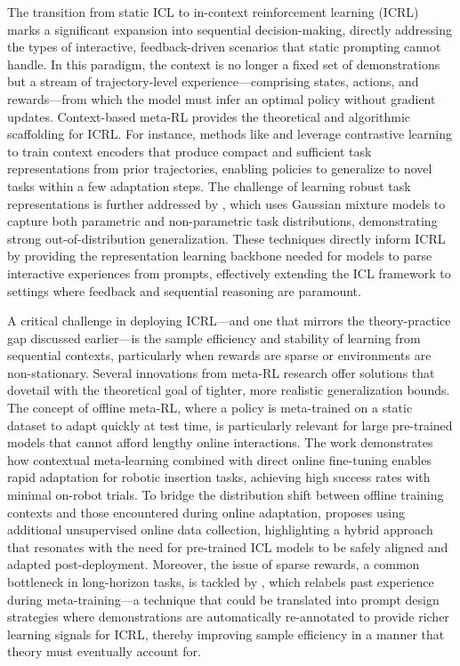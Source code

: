 \documentclass[11pt]{article}
\begin{document}
The transition from static ICL to in-context reinforcement learning (ICRL) marks a significant expansion into sequential decision-making, directly addressing the types of interactive, feedback-driven scenarios that static prompting cannot handle. In this paradigm, the context is no longer a fixed set of demonstrations but a stream of trajectory-level experience---comprising states, actions, and rewards---from which the model must infer an optimal policy without gradient updates. Context-based meta-RL provides the theoretical and algorithmic scaffolding for ICRL. For instance, methods like \cite{ref310} and \cite{ref318} leverage contrastive learning to train context encoders that produce compact and sufficient task representations from prior trajectories, enabling policies to generalize to novel tasks within a few adaptation steps. The challenge of learning robust task representations is further addressed by \cite{ref311}, which uses Gaussian mixture models to capture both parametric and non-parametric task distributions, demonstrating strong out-of-distribution generalization. These techniques directly inform ICRL by providing the representation learning backbone needed for models to parse interactive experiences from prompts, effectively extending the ICL framework to settings where feedback and sequential reasoning are paramount.

A critical challenge in deploying ICRL---and one that mirrors the theory-practice gap discussed earlier---is the sample efficiency and stability of learning from sequential contexts, particularly when rewards are sparse or environments are non-stationary. Several innovations from meta-RL research offer solutions that dovetail with the theoretical goal of tighter, more realistic generalization bounds. The concept of offline meta-RL, where a policy is meta-trained on a static dataset to adapt quickly at test time, is particularly relevant for large pre-trained models that cannot afford lengthy online interactions. The work \cite{ref594} demonstrates how contextual meta-learning combined with direct online fine-tuning enables rapid adaptation for robotic insertion tasks, achieving high success rates with minimal on-robot trials. To bridge the distribution shift between offline training contexts and those encountered during online adaptation, \cite{ref341} proposes using additional unsupervised online data collection, highlighting a hybrid approach that resonates with the need for pre-trained ICL models to be safely aligned and adapted post-deployment. Moreover, the issue of sparse rewards, a common bottleneck in long-horizon tasks, is tackled by \cite{ref595}, which relabels past experience during meta-training---a technique that could be translated into prompt design strategies where demonstrations are automatically re-annotated to provide richer learning signals for ICRL, thereby improving sample efficiency in a manner that theory must eventually account for.
\end{document}
